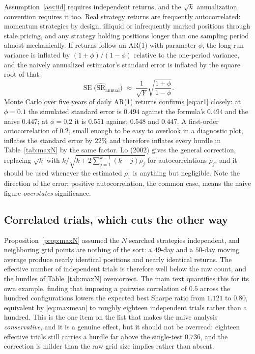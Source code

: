 \documentclass[11pt]{article}
\theoremstyle{remark}
\theoremstyle{definition}
\newcommand{\SRhat}{\widehat{\text{SR}}}
\begin{document}
Assumption~\ref{ass:iid} requires independent returns, and the $\sqrt{k}$ annualization convention requires it too. Real strategy returns are frequently autocorrelated: momentum strategies by design, illiquid or infrequently marked positions through stale pricing, and any strategy holding positions longer than one sampling period almost mechanically. If returns follow an AR(1) with parameter $\phi$, the long-run variance is inflated by $(1+\phi)/(1-\phi)$ relative to the one-period variance, and the naively annualized estimator's standard error is inflated by the square root of that:
\begin{equation}
\label{eq:ar1}
\operatorname{SE}\big(\SRhat_{\text{annual}}\big) \;\approx\; \frac{1}{\sqrt{Y}}\sqrt{\frac{1+\phi}{1-\phi}} .
\end{equation}
Monte Carlo over five years of daily AR(1) returns confirms \eqref{eq:ar1} closely: at $\phi = 0.1$ the simulated standard error is $0.494$ against the formula's $0.494$ and the naive $0.447$; at $\phi = 0.2$ it is $0.551$ against $0.548$ and $0.447$. A first-order autocorrelation of $0.2$, small enough to be easy to overlook in a diagnostic plot, inflates the standard error by $22\%$ and therefore inflates every hurdle in Table~\ref{tab:maxN} by the same factor. Lo (2002) gives the general correction, replacing $\sqrt{k}$ with $k/\sqrt{k + 2\sum_{j=1}^{k-1}(k-j)\rho_j}$ for autocorrelations $\rho_j$, and it should be used whenever the estimated $\rho_1$ is anything but negligible. Note the direction of the error: positive autocorrelation, the common case, means the naive figure \emph{overstates} significance.

\subsection{Correlated trials, which cuts the other way}

Proposition~\ref{prop:maxN} assumed the $N$ searched strategies independent, and neighboring grid points are nothing of the sort: a $49$-day and a $50$-day moving average produce nearly identical positions and nearly identical returns. The effective number of independent trials is therefore well below the raw count, and the hurdles of Table~\ref{tab:maxN} overcorrect. The main text quantifies this for its own example, finding that imposing a pairwise correlation of $0.5$ across the hundred configurations lowers the expected best Sharpe ratio from $1.121$ to $0.80$, equivalent by \eqref{eq:maxmean} to roughly eighteen independent trials rather than a hundred. This is the one item on the list that makes the naive analysis \emph{conservative}, and it is a genuine effect, but it should not be overread: eighteen effective trials still carries a hurdle far above the single-test $0.736$, and the correction is milder than the raw grid size implies rather than absent.
\end{document}
